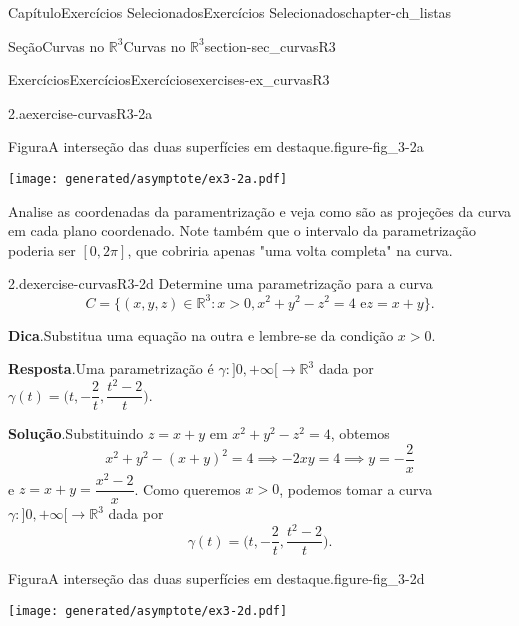 \documentclass[oneside,10pt,]{book}
\newcommand{\blocktitlefont}{\relax}
\numberwithin{equation}{section}
\newcommand{\R}{\mathbb R}
\begin{document}
\begin{chapterptx}{Capítulo}{Exercícios Selecionados}{}{Exercícios Selecionados}{}{}{chapter-ch_listas}
\begin{sectionptx}{Seção}{Curvas no \(\R^3\)}{}{Curvas no \(\R^3\)}{}{}{section-sec_curvasR3}
\begin{exercises-subsection-numberless}{Exercícios}{Exercícios}{}{Exercícios}{}{}{exercises-ex_curvasR3}
\begin{divisionexercise}{2.a}{}{}{exercise-curvasR3-2a}
\begin{figureptx}{Figura}{A interseção das duas superfícies em destaque.}{figure-fig_3-2a}{}
\begin{image}{0}{1}{0}{}%
\texttt{[image: generated/asymptote/ex3-2a.pdf]}
\end{image}%
\tcblower
\end{figureptx}%
Analise as coordenadas da paramentrização e veja como são as projeções da curva em cada plano coordenado. Note também que o intervalo da parametrização poderia ser \([0,2\pi]\), que cobriria apenas "uma volta completa" na curva.%
\end{divisionexercise}%
\begin{divisionexercise}{2.d}{}{}{exercise-curvasR3-2d}%
Determine uma parametrização para a curva%
\begin{equation*}
C = \big\{
(x,y,z)\in\R^3\colon x>0, x^2+y^2 -z^2= 4\text{ e
}z=x+y\big\}.
\end{equation*}
%
\par\smallskip%
\noindent\textbf{\blocktitlefont Dica}.\hypertarget{hint-curvasR3-2d-b}{}\quad{}Substitua uma equação na outra e lembre-se da condição \(x>0\).%
\par\smallskip%
\noindent\textbf{\blocktitlefont Resposta}.\hypertarget{answer-curvasR3-2d-c}{}\quad{}Uma parametrização é \(\gamma\colon]0,+\infty[\to\R^3\) dada por \(\gamma(t) =
\Big(t,-\dfrac{2}{t},\dfrac{t^2-2}{t}\Big)\).%
\par\smallskip%
\noindent\textbf{\blocktitlefont Solução}.\hypertarget{solution-curvasR3-2d-d}{}\quad{}Substituindo \(z=x+y\) em \(x^2 + y^2 - z^2 =4\), obtemos%
\begin{equation*}
x^2 + y^2 -(x+y)^2 = 4 \implies -2xy = 4 \implies y
= - \frac{2}{x}
\end{equation*}
e \(z = x+ y = \dfrac{x^2-2}{x}\). Como queremos \(x>0\), podemos tomar a curva \(\gamma\colon]0,+\infty[ \to\R^3\) dada por%
\begin{equation*}
\gamma(t)=\Big(t, - \frac{2}{t}, \frac{t^2-2}{t}\Big).
\end{equation*}
%
\begin{figureptx}{Figura}{A interseção das duas superfícies em destaque.}{figure-fig_3-2d}{}%
\begin{image}{0}{1}{0}{}%
\texttt{[image: generated/asymptote/ex3-2d.pdf]}
\end{image}%
\tcblower
\end{figureptx}%
\end{divisionexercise}%
\end{exercises-subsection-numberless}
\end{sectionptx}

\end{chapterptx}
\end{document}
